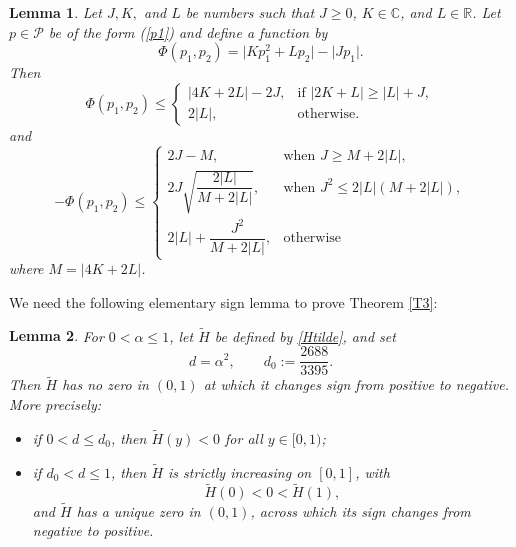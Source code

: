 \documentclass[10pt,a4paper]{amsart}
\newtheorem{lem}{Lemma}[section]
\numberwithin{equation}{section}
\begin{document}
\begin{lem}\label{L6}\cite{SimThomas2020}
Let $J, K,$ and $L$ be numbers such that $J \ge 0$, $K \in \mathbb{C}$, and $L \in \mathbb{R}$. 
Let $p \in \mathcal{P}$ be of the form (\ref{p1}) and define a function by
\[
\Phi(p_1,p_2) = \big| K p_1^2 + L p_2 \big| - \big| J p_1 \big|.
\]
Then 
\[
\Phi(p_{1}, p_{2}) \le 
\begin{cases}
|4K + 2L| - 2J, & \text{if } |2K + L| \ge |L| + J, \\[6pt]
2|L|, & \text{otherwise.}
\end{cases}
\]
and
\[
- \Phi(p_1,p_2) \le 
\begin{cases}
2J - M, & \text{when } J \ge M + 2|L|, \\[6pt]
2J \sqrt{\dfrac{ 2|L|}{M + 2|L|}}, & \text{when } J^2 \le 2|L|(M + 2|L|), \\[10pt]
2|L| +\dfrac{ J^2}{M + 2|L|}, & \text{otherwise}
\end{cases}
\]
where $M=|4K+2L|$.
\end{lem}

We need the following elementary sign lemma to prove Theorem \eqref{T3}:

\begin{lem}\label{lem:Hsign}
For $0<\alpha\le 1$, let $\widetilde H$ be defined by \eqref{Htilde}, and set
\[
d=\alpha^2,\qquad d_0:=\frac{2688}{3395}.
\]
Then $\widetilde H$ has no zero in $(0,1)$ at which it changes sign from positive to negative. More precisely:
\begin{itemize}
\item[(i)] if $0<d\le d_0$, then $\widetilde H(y)<0$ for all $y\in[0,1)$;
\item[(ii)] if $d_0<d\le1$, then $\widetilde H$ is strictly increasing on $[0,1]$, with
\[
\widetilde H(0)<0<\widetilde H(1),
\]
and $\widetilde H$ has a unique zero in $(0,1)$, across which its sign changes from negative to positive.
\end{itemize}
\end{lem}
\end{document}
